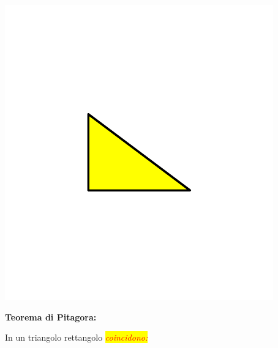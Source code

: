 \documentclass[12pt,italian,oneside]{report}
\newcommand{\rosso}[1]{\textcolor{red}{#1}}
\newcommand{\sfondogiallo}[1]{\colorbox{yellow}{#1}}
\begin{document}
\begin{center}
\includegraphics[scale=1.2]{pitagora1}
\end{center}

\begin{firstheadlineitemize}

\item \textbf{Teorema di Pitagora:}

\begin{secondheadlineitemize}

\item  In un triangolo rettangolo \sfondogiallo{\rosso{\textit{coincidono:}}}

\end{secondheadlineitemize}

\end{firstheadlineitemize}

\newframe
\end{document}

